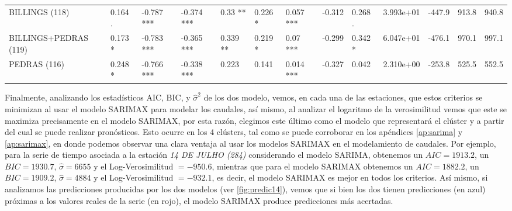 \documentclass[12pt,oneside]{book}\usepackage[]{graphicx}\usepackage[]{color}
\newenvironment{knitrout}{}{} %
\theoremstyle{definition} %
\begin{document}
\begin{knitrout}
\begin{landscape}
\begin{table}
{\begin{tabular}[t]{lllllllllrrrr}
\rowcolor{gray!6}  BILLINGS (118) & 0.164 . & -0.787 *** & -0.374 *** & 0.33 ** & 0.226 * & 0.057 *** & -0.312 & 0.268 . & 3.993e+01 & -447.9 & 913.8 & 940.8\\
BILLINGS+PEDRAS (119) & 0.173 * & -0.783 *** & -0.365 *** & 0.339 ** & 0.219 * & 0.07 *** & -0.299 & 0.342 * & 6.047e+01 & -476.1 & 970.1 & 997.1\\
\addlinespace
\rowcolor{gray!6}  PEDRAS (116) & 0.248 * & -0.766 *** & -0.338 *** & 0.223 & 0.141 & 0.014 *** & -0.327 & 0.042 & 2.310e+00 & -253.8 & 525.5 & 552.5\\
\bottomrule
\end{tabular}}
\end{table}
\end{landscape}


\end{knitrout}


Finalmente, analizando los estadísticos AIC, BIC, y $\hat\sigma^2$ de los dos modelo, vemos, en cada una de las estaciones, que estos criterios se minimizan al usar el modelo SARIMAX para modelar los caudales, así mismo, al analizar el logaritmo de la verosimilitud vemos que este se maximiza precisamente en el modelo SARIMAX, por esta razón, elegimos este último como el modelo que representará el clúster y a partir del cual se puede realizar pronósticos. Esto ocurre en los 4 clústers, tal como se puede corroborar en los apéndices \ref{ap:sarima} y \ref{ap:sarimax}, en donde podemos observar una clara ventaja al usar los modelos SARIMAX en el modelamiento de caudales. Por ejemplo, para la serie de tiempo asociada a la estación \textit{14 DE JULHO (284)} considerando el modelo SARIMA, obtenemos un $AIC = 1913.2$, un $BIC=1930.7$, $\hat\sigma = 6655 $ y el Log-Verosimilitud $= -950.6$, mientras que para el modelo SARIMAX obtenemos un $AIC = 1882.2$, un $BIC=1909.2$, $\hat\sigma = 4884 $ y el Log-Verosimilitud $=-932.1$, es decir, el modelo SARIMAX es mejor en todos los criterios. Así mismo, si analizamos las predicciones producidas por los dos modelos (ver \ref{fig:predic14}), vemos que si bien los dos tienen predicciones (en azul) próximas a los valores reales de la serie (en rojo), el modelo SARIMAX produce predicciones más acertadas.
\end{document}
